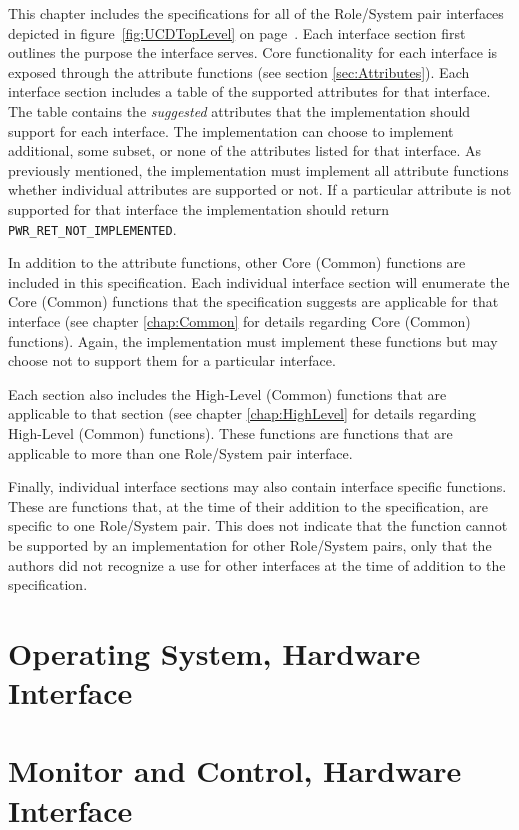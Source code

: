 
This chapter includes the specifications for all of the Role/System pair interfaces depicted in figure~\ref{fig:UCDTopLevel} on page~\pageref{fig:UCDTopLevel}.
Each interface section first outlines the purpose the interface serves.
Core functionality for each interface is exposed through the attribute functions (see section \ref{sec:Attributes}).
Each interface section includes a table of the supported attributes for that interface. 
The table contains the \textit{suggested} attributes that the implementation should support for each interface. 
The implementation can choose to implement additional, some subset, or none of the attributes listed for that interface.
As previously mentioned, the implementation must implement all attribute functions whether individual attributes are supported or not.
If a particular attribute is not supported for that interface the implementation should return \texttt{PWR_RET_NOT_IMPLEMENTED}.

In addition to the attribute functions, other Core (Common) functions are included in this specification.
Each individual interface section will enumerate the Core (Common) functions that the specification suggests are applicable for that interface (see chapter \ref{chap:Common} for details regarding Core (Common) functions).
Again, the implementation must implement these functions but may choose not to support them for a particular interface.

Each section also includes the High-Level (Common) functions that are applicable to that section (see chapter \ref{chap:HighLevel} for details regarding High-Level (Common) functions).
These functions are functions that are applicable to more than one Role/System pair interface.

Finally, individual interface sections may also contain interface specific functions.
These are functions that, at the time of their addition to the specification, are specific to one Role/System pair. 
This does not indicate that the function cannot be supported by an implementation for other Role/System pairs, only that the authors did not recognize a use for other interfaces at the time of addition to the specification.



\section{Operating System, Hardware Interface}\label{sec:OSHW}


\newpage
\section{Monitor and Control, Hardware Interface}\label{sec:MCHW}


